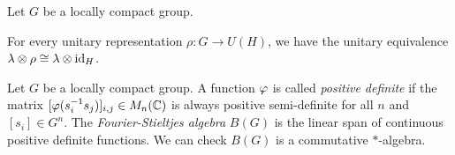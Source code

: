 \documentclass{../../../small}
\begin{document}
\begin{lem}
Let $G$ be a locally compact group.
\begin{parts}
\item For every unitary representation $\rho:G\to U(H)$, we have the unitary equivalence $\lambda\otimes\rho\cong\lambda\otimes\operatorname{id}_H$.
\end{parts}
\end{lem}


\begin{defn}
Let $G$ be a locally compact group.
A function $\varphi$ is called \emph{positive definite} if the matrix $[\varphi(s_i^{-1}s_j)]_{i,j}\in M_n(\mathbb{C})$ is always positive semi-definite for all $n$ and $[s_i]\in G^n$.
The \emph{Fourier-Stieltjes algebra} $B(G)$ is the linear span of continuous positive definite functions.
We can check $B(G)$ is a commutative $*$-algebra.
\end{defn}
\end{document}
